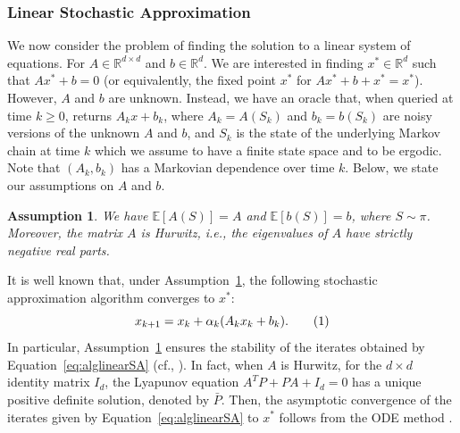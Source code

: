 \documentclass{article}
\newcommand{\numberthis}{\addtocounter{equation}{1}\tag{\theequation}}
\newcommand{\lrs}[1]{\left[ #1 \right]}
\newcommand{\E}[1]{\mathbb{E}\lrs{#1}}
\newcommand{\R}{\mathbb{R}}
\newtheorem{assmp}{Assumption}
\begin{document}




\subsubsection{Linear Stochastic Approximation}\label{sec:linearSA}
We now consider the problem of finding the solution to a linear system of equations. For $A \in \R^{d\times d}$ and $b\in \R^d$. We are interested in finding $x^* \in \R^d$ such that $Ax^* + b = 0$ (or equivalently, the fixed point $x^*$ for $Ax^* + b + x^* = x^*$). However, $A$ and $b$ are unknown. Instead, we have an oracle that, when queried at time $k\geq 0$, returns $A_k x + b_k$, where $A_k = A(S_k)$ and $b_k = b(S_k)$ are noisy versions of the unknown $A$ and $b$, and $S_k$ is the state of the underlying Markov chain at time $k$ which we assume to have a finite state space and to be ergodic. Note that $(A_k, b_k)$ has a Markovian dependence over time $k$. Below, we state our assumptions on $A$ and $b$. 

\begin{assmp}\label{assmp:linearSA}
We have $\E{ A(S)} = A$ and $\E{b(S)} = b$, where ${S\sim \pi}$. Moreover, the matrix $A$ is Hurwitz, i.e., the eigenvalues of $A$ have strictly negative real parts. 
\end{assmp}

It is well known that, under Assumption~\ref{assmp:linearSA}, the following stochastic approximation algorithm converges to $x^*$:
\[ x_{k+1} = x_k + \alpha_k (A_k x_k + b_k). \numberthis\label{eq:alglinearSA} \]
In particular, Assumption~\ref{assmp:linearSA} ensures the stability of the iterates obtained by Equation~\eqref{eq:alglinearSA} (cf., \citet{srikant2019finite}). In fact, when $A$ is Hurwitz, for the $d\times d$ identity matrix $I_d$, the Lyapunov equation $A^T P+P A +I_d = 0$ has a unique positive definite solution, denoted by $\bar{P}$. Then, the asymptotic convergence of the iterates given by Equation~\eqref{eq:alglinearSA} to $x^*$ follows from the ODE method \cite{borkar2009stochastic}. %
\end{document}
